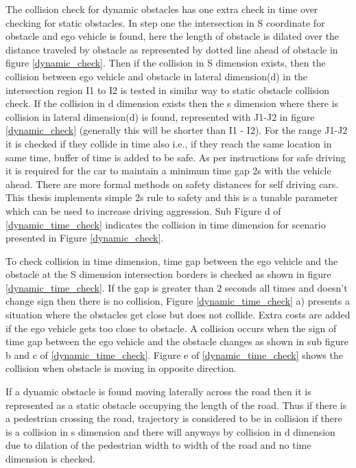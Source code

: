 The collision check for dynamic obstacles has one extra check in time over checking for static obstacles. In step one the intersection in S coordinate for obstacle and ego vehicle is found, here the length of obstacle is dilated over the distance traveled by obstacle as represented by dotted line ahead of obstacle in figure \ref{dynamic_check}. Then if the collision in S dimension exists, then the collision between ego vehicle and obstacle in lateral dimension(d) in the intersection region I1 to I2 is tested in similar way to static obstacle collision check. If the collision in d dimension exists then the s dimension where there is collision in lateral dimension(d) is found, represented with J1-J2 in figure \ref{dynamic_check} (generally this will be shorter than I1 - I2). For the range J1-J2 it is checked if they collide in time also i.e., if they reach the same location in same time, buffer of time is added to be safe. As per instructions for safe driving it is required for the car to maintain a minimum time gap 2s with the vehicle ahead. There are more formal methods \cite{mobile_eye_safety_distance} on safety distances for self driving cars. This thesis implements simple 2s rule to safety and this is a tunable parameter which can be used to increase driving aggression. Sub Figure d of \ref{dynamic_time_check} indicates the collision in time dimension for scenario presented in Figure \ref{dynamic_check}.

To check collision in time dimension, time gap between the ego vehicle and the obstacle at the S dimension intersection borders is checked as shown in figure \ref{dynamic_time_check}. If the gap is greater than 2 seconds all times and doesn't change sign then there is no collision, Figure \ref{dynamic_time_check} a) presents a situation where the obstacles get close but does not collide. Extra costs are added if the ego vehicle gets too close to obstacle. A collision occurs when the sign of time gap between the ego vehicle and the obstacle changes as shown in sub figure b and c of \ref{dynamic_time_check}. Figure e of \ref{dynamic_time_check} shows the collision when obstacle is moving in opposite direction. 

If a dynamic obstacle is found moving laterally across the road then it is represented as a static obstacle occupying the length of the road. Thus if there is a pedestrian crossing the road, trajectory is considered to be in collision if there is a collision in s dimension and there will anyways by collision in d dimension due to dilation of the pedestrian width to width of the road and no time dimension is checked.

